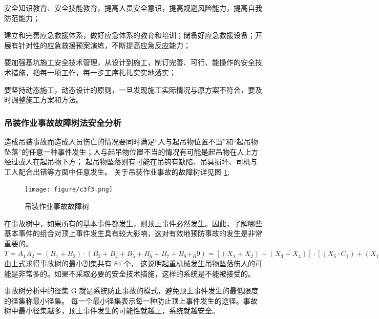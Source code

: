  安全知识教育、安全技能教育，提高人员安全意识，提高规避风险能力，提高自我防范能力；

 建立和完善应急救援体系，做好应急体系的教育和培训；储备好应急救援设备；开展有针对性的应急救援预案演练，不断提高应急反应能力；

 要加强基坑施工安全技术管理，从设计到施工，制订完善、可行、能操作的安全技术措施，把每一项工作，每一步工序扎扎实实地落实；

 要坚持动态施工，动态设计的原则，一旦发现施工实际情况与原方案不符合，要及时调整施工方案和方法。


\subsubsection{吊装作业事故故障树法安全分析}

造成吊装事故而造成人员伤亡的情况要同时满足“人与起吊物位置不当”和“起吊物坠落”的任意一种事件发生；人与起吊物位置不当的情况有可能是起吊物在人上方经过或人在起吊物下方；
起吊物坠落则有可能在吊钩有缺陷、吊具损坏、司机与工人配合出错等方面中任意发生。
关于吊装作业事故的故障树详见图 \ref{fig:c3f3};

\begin{landscape}
\begin{figure}[thbp!]
    \centering
    \texttt{[image: figure/c3f3.png]}
    \caption{吊装作业事故故障树}
    \label{fig:c3f3}
\end{figure}
\end{landscape}

在事故树中，如果所有的基本事件都发生，则顶上事件必然发生。因此，了解哪些基本事件的组合对顶上事件发生具有较大影响，这对有效地预防事故的发生是非常重要的。\\

$T=A_1A_2=(B_1+B_2)·(B_3+B_4+B_5+B_6+B_7+B_8+_B9)=[(X_1+X_2)+(X_3+X_4)]·[(X_5·C_1)+(X_{15}+C_2)+(X_{18}+X_{19})+(X_{20}+X_{21}+C_3)+(X_{24}·X_{25})+(X_{26}+X_{27})+(X_{28}+X_{29})]
=(X_1+X_2+X_3+X_4)·[X_5·(D_1+D_2+D_3)+X_{15}+(X_{16}+X_{17})+(X_{18}+X_{19})+X_{20}+X_{21}+
(X_{22}+X_{23})+X_{24}·X_{25}+X_{26}+X_{27}+X_{28}+X_{29}]
=(X_1+X_2+X_3+X_4)·[X_3·(X_6+X_7+X_8+X_9+X_{10}+X_{11}+X_{12}+X_{13}·X_{14}+X_{15}+X_{16}+X_{17}+X_{18}+X_{19}
+X_{20}+X_{21}+X_{22}+X_{23}+X_{24}+X_{25}+X_{26}+X_{27}+X_{28})]$\\

由上式求得事故树的最小割集共有 84 个，
这说明起重机械发生吊物坠落伤人的可能是非常多的。如果不采取必要的安全技术措施，这样的系统是不能被接受的。

事故树分析中的径集 G 就是系统防止事故的模式，避免顶上事件发生的最低限度的径集称最小径集。
每一个最小径集表示每一种防止顶上事件发生的途径。事故树中最小径集越多，顶上事件发生的可能性就越上，系统就越安全。\\


